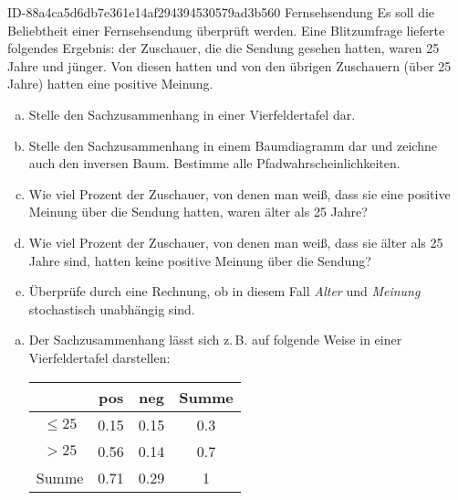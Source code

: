 \begin{exercise}
      {ID-88a4ca5d6db7e361e14af294394530579ad3b560}
      {Fernsehsendung}
  \ifproblem\problem
    Es soll die Beliebtheit einer Fernsehsendung überprüft werden.
    Eine Blitzumfrage lieferte folgendes Ergebnis:  der Zuschauer,
    die die Sendung gesehen hatten, waren 25 Jahre und jünger.
    Von diesen hatten  und von den übrigen Zuschauern (über 25
    Jahre) hatten  eine positive Meinung.
    \begin{enumerate}[a)]
      \item Stelle den Sachzusammenhang in einer Vierfeldertafel dar.
      \item Stelle den Sachzusammenhang in einem Baumdiagramm dar und
            zeichne auch den inversen Baum. Bestimme alle Pfadwahrscheinlichkeiten.
      \item Wie viel Prozent der Zuschauer, von denen man weiß, dass sie
            eine positive Meinung über die Sendung hatten, waren älter
            als 25 Jahre?
      \item Wie viel Prozent der Zuschauer, von denen man weiß, dass sie
            älter als 25 Jahre sind, hatten keine positive Meinung über
            die Sendung?
      \item Überprüfe durch eine Rechnung, ob in diesem Fall \textit{Alter} und
            \textit{Meinung} stochastisch unabhängig sind.
    \end{enumerate}
  \fi
  \ifoutcome\outcome
    \begin{enumerate}[a)]
      \item Der Sachzusammenhang lässt sich z.\,B. auf folgende Weise in
            einer Vierfeldertafel darstellen:
            \begin{center}
              \renewcommand{\arraystretch}{1.25}%
              \begin{tabular}{|c||c|c||c|}
                \hline
                         & pos        & neg        & Summe     \\
                \hline
                \hline
                $\leq25$ & \num{0.15} & \num{0.15} & \num{0.3} \\
                \hline
                $>25$    & \num{0.56} & \num{0.14} & \num{0.7} \\
                \hline
                \hline
                Summe    & \num{0.71} & \num{0.29} & \num{1}   \\
                \hline
              \end{tabular}

\end{center}
\end{enumerate}
\end{exercise}
